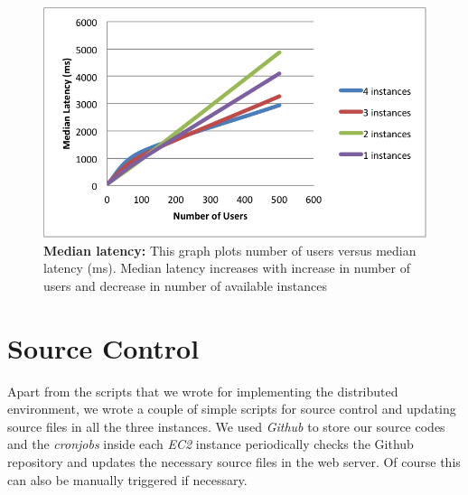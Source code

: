 \documentclass[12pt]{article}
\begin{document}
\begin{figure}[H] 
\centering
\includegraphics[scale=0.75]{Images/median_latency.PNG} 
\caption{\textbf{Median
latency: } This graph plots number of users versus median latency (ms). Median latency 
increases with increase in number of users and decrease in number of available instances} 
\label{fig:median_latency} 
\end{figure}

\section{Source Control} 
Apart from the scripts that we wrote for implementing the distributed environment, 
we wrote a couple of simple scripts for source control and updating source files in all the three
instances. We used \emph{Github} \cite{github} to store our source codes and the
\emph{cronjobs} inside each \emph{EC2} instance periodically checks the {Github}
repository and updates the necessary source files in the web server. Of course
this can also be manually triggered if necessary.
\end{document}
